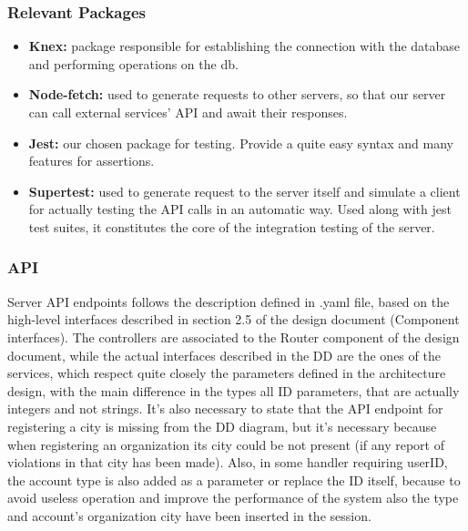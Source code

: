 \subsubsection{Relevant Packages}
\begin{itemize}
	\item \textbf{Knex:} package responsible for establishing the connection with the database and performing operations on the db. 
	\item \textbf{Node-fetch:} used to generate requests to other servers, so that our server can call external services' API and await their responses.
	\item \textbf{Jest:} our chosen package for testing. Provide a quite easy syntax and many features for assertions.
	\item \textbf{Supertest:} used to generate request to the server itself and simulate a client for actually testing the API calls in an automatic way. Used along with jest test suites, it constitutes the core of the integration testing of the server.
\end{itemize}

\subsubsection{API}
Server API endpoints follows the description defined in .yaml file, based on the high-level interfaces described in section 2.5 of the design document (Component interfaces). The controllers are associated to the Router component of the design document, while the actual interfaces described in the DD are the ones of the services, which respect quite closely the parameters defined in the architecture design, with the main difference in the types all ID parameters, that are actually integers and not strings. It's also necessary to state that the API endpoint for registering a city is missing from the DD diagram, but it's necessary because when registering an organization its city could be not present (if any report of violations in that city has been made). Also, in some handler requiring userID, the account type is also added as a parameter or replace the ID itself, because to avoid useless operation and improve the performance of the system also the type and account's organization city have been inserted in the session. 